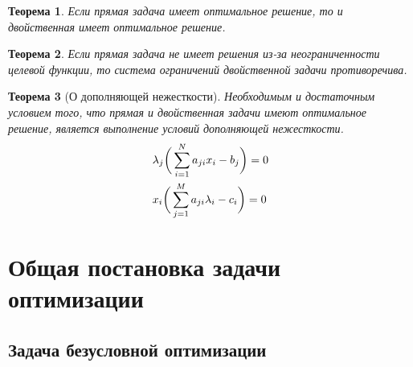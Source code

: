 \documentclass[12pt]{article}
\newtheorem{theorem}{Теорема}[subsection]
\theoremstyle{definition}
\theoremstyle{remark}
\begin{document}
\begin{theorem}
Если прямая задача имеет оптимальное решение, то и двойственная имеет оптимальное решение.
\end{theorem}

\begin{theorem}
Если прямая задача не имеет решения из-за неограниченности целевой функции, то система ограничений двойственной задачи противоречива.
\end{theorem}

\begin{theorem}[О дополняющей нежесткости]
Необходимым и достаточным условием того, что прямая и двойственная задачи имеют оптимальное решение, является выполнение условий дополняющей нежесткости.
\begin{align}
  &\lambda_j\bigg(\sum_{i=1}^N a_{ji}x_i-b_j\bigg)=0\\
  &x_i\bigg(\sum_{j=1}^M a_{ji}\lambda_i-c_i\bigg)=0\notag
\end{align}
\end{theorem}

\section{Общая постановка задачи оптимизации}
\subsection{Задача безусловной оптимизации}
\end{document}
